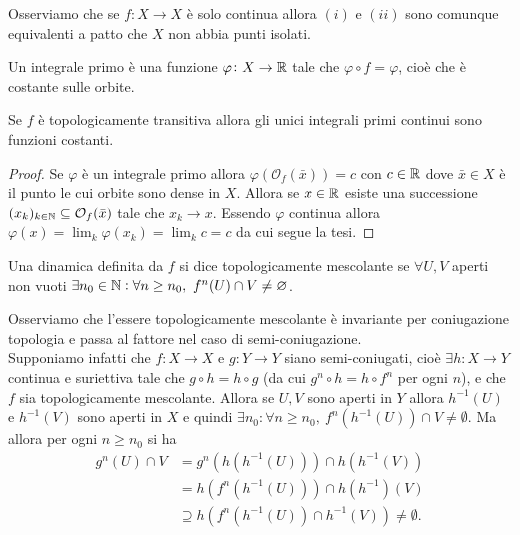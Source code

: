 Osserviamo che se $ f \colon X \to X $ è solo continua allora $ (i) $ e $ (ii) $ sono comunque equivalenti a patto che $ X $ non abbia punti isolati. \\

\begin{definition}
	Un integrale primo è una funzione $ \varphi \colon X \to \mathbb{R} $ tale che $ \varphi \circ f = \varphi $, cioè che è costante sulle orbite. 
\end{definition}

\begin{proposition}
	Se $ f $ è topologicamente transitiva allora gli unici integrali primi continui sono funzioni costanti.
\end{proposition}
%
\begin{proof}
	Se $ \varphi $ è un integrale primo allora $ \varphi(\mathcal{O}_f(\bar{x})) = c $ con $ c \in \mathbb{R} $ dove $ \bar{x} \in X $ è il punto le cui orbite sono dense in $ X $. Allora se $ x \in \mathbb{R} $ esiste una successione $ (x_k)_{k \in \mathbb{N}} \subseteq \mathcal{O}_f(\bar{x}) $ tale che $ x_k \to x $. Essendo $ \varphi $ continua allora $ \varphi(x) = \lim_{k} \varphi(x_k) = \lim_{k} c = c $ da cui segue la tesi. 
\end{proof}

\begin{definition}
	Una dinamica definita da $ f $ si dice topologicamente mescolante se $ \forall U, V $ aperti non vuoti $ \exists n_0 \in \mathbb{N} : \forall n \geq n_0, \ f^n(U) \cap V \neq \varnothing $. 
\end{definition}

Osserviamo che l'essere topologicamente mescolante è invariante per coniugazione topologia e passa al fattore nel caso di semi-coniugazione. \\
Supponiamo infatti che $ f \colon X \to X $ e $ g \colon Y \to Y $ siano semi-coniugati, cioè $ \exists h \colon X \to Y $ continua e suriettiva tale che $ g \circ h = h \circ g $ (da cui $ g^n \circ h = h \circ f^n $ per ogni $ n $), e che $ f $ sia topologicamente mescolante. Allora se $ U, V $ sono aperti in $ Y $ allora $ h^{-1}(U) $ e $ h^{-1}(V) $ sono aperti in $ X $ e quindi $ \exists n_0 : \forall n \geq n_0, \ f^{n}(h^{-1}(U)) \cap V \neq \emptyset $. Ma allora per ogni $ n \geq n_0 $ si ha 
\begin{align*}
    g^n(U) \cap V & = g^{n}(h(h^{-1}(U))) \cap h(h^{-1}(V)) \\
    & = h(f^n(h^{-1}(U))) \cap h(h^{-1})(V) \\
    & \supseteq h\left(f^n(h^{-1}(U)) \cap h^{-1}(V)\right) \neq \emptyset.
\end{align*}

